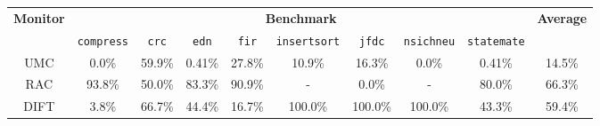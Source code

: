 

\begin{tabular}{|c|c|c|c|c|c|c|c|c|c|}
\hline

\multirow{2}{*}{\bf Monitor} & \multicolumn{8}{c|}{\bf Benchmark} & \multirow{2}{*}{\bf Average} \\ \cline{2-9}
 & {\tt compress} & {\tt crc} & {\tt edn} & {\tt fir} & {\tt insertsort} & {\tt jfdc} & {\tt nsichneu} & {\tt statemate} & \\ \hline \hline

 UMC & 0.0\% & 59.9\% & 0.41\% & 27.8\% & 10.9\% & 16.3\% & 0.0\% & 0.41\% & 14.5\% \\\hline
 RAC & 93.8\% & 50.0\% & 83.3\% & 90.9\% & - & 0.0\% & - & 80.0\% & 66.3\% \\\hline
 DIFT & 3.8\% & 66.7\% & 44.4\% & 16.7\% & 100.0\% & 100.0\% & 100.0\% & 43.3\% & 59.4\% \\\hline

\end{tabular}
